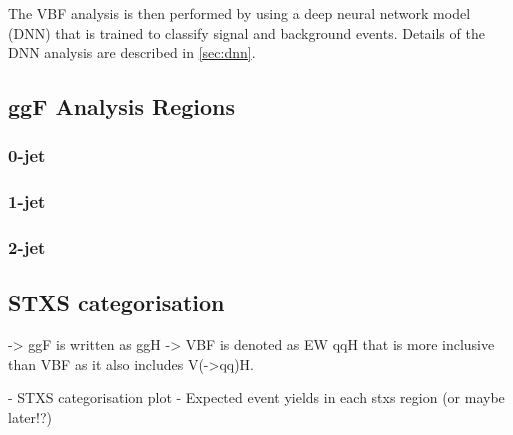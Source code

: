 The VBF analysis is then performed by using a deep neural network model (DNN) that is trained to classify signal and background events. Details of the DNN analysis are described in \cref{sec:dnn}.


\subsection{ggF Analysis Regions}


\subsubsection{0-jet}
\subsubsection{1-jet}
\subsubsection{2-jet}

\subsection{STXS categorisation}
-> ggF is written as ggH
-> VBF is denoted as EW qqH that is more inclusive than VBF as it also includes V(->qq)H. 

- STXS categorisation plot
- Expected event yields in each stxs region (or maybe later!?)